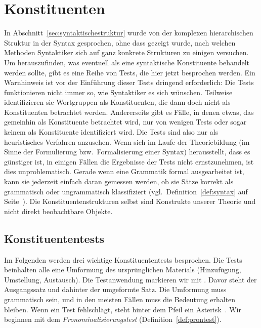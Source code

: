 \section{Konstituenten}
\label{sec:konstituenten}


In Abschnitt~\ref{sec:syntaktischestruktur} wurde von der komplexen hierarchischen Struktur in der Syntax gesprochen, ohne dass gezeigt wurde, nach welchen Methoden Syntaktiker sich auf ganz konkrete Strukturen zu einigen versuchen.
Um herauszufinden, was eventuell als eine syntaktische Konstituente behandelt werden sollte, gibt es eine Reihe von Tests, die hier jetzt besprochen werden.
Ein Warnhinweis ist vor der Einführung dieser Tests dringend erforderlich:
Die Tests funktionieren nicht immer so, wie Syntaktiker es sich wünschen.
Teilweise identifizieren sie Wortgruppen als Konstituenten, die dann doch nicht als Konstituenten betrachtet werden.
Andererseits gibt es Fälle, in denen etwas, das gemeinhin als Konstituente betrachtet wird, nur von wenigen Tests oder sogar keinem als Konstituente identifiziert wird.
Die Tests sind also nur als heuristisches Verfahren anzusehen.
Wenn sich im Laufe der Theoriebildung (im Sinne der Formulierung bzw.\ Formalisierung einer Syntax) herausstellt, dass es günstiger ist, in einigen Fällen die Ergebnisse der Tests nicht ernstzunehmen, ist dies unproblematisch.
Gerade wenn eine Grammatik formal ausgearbeitet ist, kann sie jederzeit einfach daran gemessen werden, ob sie Sätze korrekt als grammatisch oder ungrammatisch klassifiziert (vgl.\ Definition~\ref{def:syntax} auf Seite~\pageref{def:syntax}).
Die Konstituentenstrukturen selbst sind Konstrukte unserer Theorie und nicht direkt beobachtbare Objekte.

\subsection{Konstituententests}
\label{sec:konstituententests}

Im Folgenden werden drei wichtige Konstituententests besprochen.
Die Tests beinhalten alle eine Umformung des ursprünglichen Materials (Hinzufügung, Umstellung, Austausch).
Die Testanwendung markieren wir mit .
Davor steht der Ausgangssatz und dahinter der umgeformte Satz.
Die Umformung muss grammatisch sein, und in den meisten Fällen muss die Bedeutung erhalten bleiben.
Wenn ein Test fehlschlägt, steht hinter dem Pfeil ein Asterisk~\Ast.
Wir beginnen mit dem \textit{Pronominalisierungstest} (Definition~\ref{def:prontest}).

